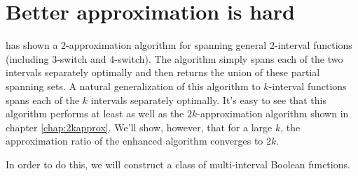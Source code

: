 \chapter{Better approximation is hard}

\citeauthor{Dubovsky2012} has shown a $2$-approximation algorithm
for spanning general $2$-interval functions
(including $3$-switch and $4$-switch).\citep[p.~33]{Dubovsky2012}
The algorithm simply spans each of the two intervals
separately optimally and then returns the union
of these partial spanning sets.
A natural generalization of this algorithm to $k$-interval
functions spans each of the $k$ intervals separately
optimally.
It's easy to see that this algorithm performs
at least as well as the $2k$-approximation algorithm
shown in chapter \ref{chap:2kapprox}.
We'll show, however,
that for a large $k$,
the approximation ratio of the enhanced algorithm
converges to $2k$.

In order to do this,
we will construct a class of  multi-interval
Boolean functions.

